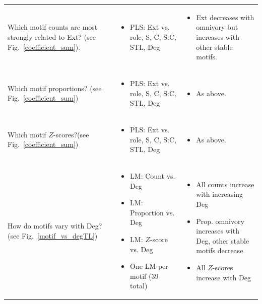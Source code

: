 \documentclass[12pt]{article}
\begin{document}
\begin{landscape}
\begin{table}[h!]
\begin{tabular}{m{6cm}|m{7.5cm}|m{8cm}}
        \hline
        Which motif counts are most strongly related to Ext? (see Fig.~\ref{coefficient_sum}). & \begin{itemize}
            \item PLS: Ext vs. role, S, C, S:C, STL, Deg
        \end{itemize} & \begin{itemize}\item Ext decreases with omnivory but increases with other stable motifs. \end{itemize}\\
        Which motif proportions? (see Fig.~\ref{coefficient_sum}) & \begin{itemize}
            \item PLS: Ext vs. role, S, C, S:C, STL, Deg
        \end{itemize} & \begin{itemize}\item As above. \end{itemize}\\
        Which motif $Z$-scores?(see Fig.~\ref{coefficient_sum}) & \begin{itemize}
            \item PLS: Ext vs. role, S, C, S:C, STL, Deg
        \end{itemize} & \begin{itemize}\item As above. \end{itemize} \\
        \hline
        How do motifs vary with Deg? \newline(see Fig.~\ref{motif_vs_degTL}) & \begin{itemize} 
        \item LM: Count vs. Deg 
        \item LM: Proportion vs. Deg 
        \item LM: $Z$-score vs. Deg 
        \item One LM per motif (39 total)
        \end{itemize} 
        & 
        \begin{itemize}
            \item All counts increase with increasing Deg
            \item Prop. omnivory increases with Deg, other stable motifs decrease
            \item All $Z$-scores increase with Deg \end{itemize}\\

\end{tabular}
\end{table}
\end{landscape}
\end{document}
